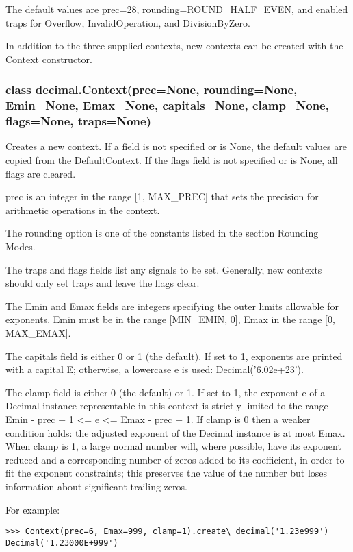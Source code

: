 The default values are prec=28, rounding=ROUND\_HALF\_EVEN, and enabled traps for Overflow, InvalidOperation, and DivisionByZero.

\vpara
In addition to the three supplied contexts, new contexts can be created with the Context constructor.

\subsubsection{class decimal.Context(prec=None, rounding=None, Emin=None, Emax=None, capitals=None, clamp=None, flags=None, traps=None)}

Creates a new context. If a field is not specified or is None, the default values are copied from the DefaultContext. If the flags field is not specified or is None, all flags are cleared.

\vpara
prec is an integer in the range [1, MAX\_PREC] that sets the precision for arithmetic operations in the context.

\vpara
The rounding option is one of the constants listed in the section Rounding Modes.

\vpara
The traps and flags fields list any signals to be set. Generally, new contexts should only set traps and leave the flags clear.

\vpara
The Emin and Emax fields are integers specifying the outer limits allowable for exponents. Emin must be in the range [MIN\_EMIN, 0], Emax in the range [0, MAX\_EMAX].

\vpara
The capitals field is either 0 or 1 (the default). If set to 1, exponents are printed with a capital E; otherwise, a lowercase e is used: Decimal('6.02e+23').

\vpara
The clamp field is either 0 (the default) or 1. If set to 1, the exponent e of a Decimal instance representable in this context is strictly limited to the range Emin - prec + 1 <= e <= Emax - prec + 1. If clamp is 0 then a weaker condition holds: the adjusted exponent of the Decimal instance is at most Emax. When clamp is 1, a large normal number will, where possible, have its exponent reduced and a corresponding number of zeros added to its coefficient, in order to fit the exponent constraints; this preserves the value of the number but loses information about significant trailing zeros. 

For example:

\begin{lstlisting}
>>> Context(prec=6, Emax=999, clamp=1).create\_decimal('1.23e999')
Decimal('1.23000E+999')
\end{lstlisting}

